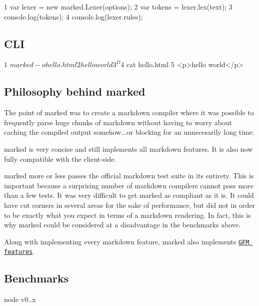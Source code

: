 \begin{DoxyCode}
1 var lexer = new marked.Lexer(options);
2 var tokens = lexer.lex(text);
3 console.log(tokens);
4 console.log(lexer.rules);
\end{DoxyCode}


\subsection*{C\+L\+I}


\begin{DoxyCode}
1 $ marked -o hello.html
2 hello world
3 ^D
4 $ cat hello.html
5 <p>hello world</p>
\end{DoxyCode}


\subsection*{Philosophy behind marked}

The point of marked was to create a markdown compiler where it was possible to frequently parse huge chunks of markdown without having to worry about caching the compiled output somehow...or blocking for an unnecesarily long time.

marked is very concise and still implements all markdown features. It is also now fully compatible with the client-\/side.

marked more or less passes the official markdown test suite in its entirety. This is important because a surprising number of markdown compilers cannot pass more than a few tests. It was very difficult to get marked as compliant as it is. It could have cut corners in several areas for the sake of performance, but did not in order to be exactly what you expect in terms of a markdown rendering. In fact, this is why marked could be considered at a disadvantage in the benchmarks above.

Along with implementing every markdown feature, marked also implements \href{http://github.github.com/github-flavored-markdown/}{\tt G\+F\+M features}.

\subsection*{Benchmarks}

node v0..\+x




